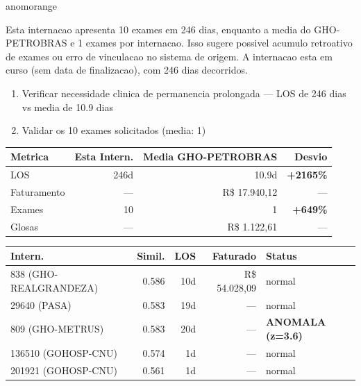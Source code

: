 \documentclass[a4paper,10pt]{article}
\begin{document}
\begin{anomalycard}[Internacao 140406 | GHO-PETROBRAS | ALTO (z=4.79)]{anomorange}
\vspace{2pt}\begin{tcolorbox}[colback=severityred!20,colframe=anomorange,title={\textbf{Interpretacao de Negocio}},fonttitle=\bfseries\small,left=4pt,right=4pt,top=3pt,bottom=3pt]
{\small Esta internacao apresenta 10 exames em 246 dias, enquanto a media do GHO-PETROBRAS e 1 exames por internacao. Isso sugere possivel acumulo retroativo de exames ou erro de vinculacao no sistema de origem. A internacao esta em curso (sem data de finalizacao), com 246 dias decorridos.}
\end{tcolorbox}
\begin{tcolorbox}[colback=severityyellow!30,colframe=anomorange,title={\textbf{Recomendacoes Especificas}},fonttitle=\bfseries\small,left=4pt,right=4pt,top=3pt,bottom=3pt]
\begin{enumerate}[nosep,leftmargin=16pt]
\item {\small Verificar necessidade clinica de permanencia prolongada --- LOS de 246 dias vs media de 10.9 dias}
\item {\small Validar os 10 exames solicitados (media: 1)}
\end{enumerate}
\end{tcolorbox}
\begin{center}\begin{tabular}{l r r r}\toprule\textbf{Metrica} & \textbf{Esta Intern.} & \textbf{Media GHO-PETROBRAS} & \textbf{Desvio} \\\midrule
LOS & 246d & 10.9d & \textcolor{anomred}{\textbf{+2165\%}} \\
Faturamento & --- & R\$ 17.940,12 & --- \\
Exames & 10 & 1 & \textcolor{anomred}{\textbf{+649\%}} \\
Glosas & --- & R\$ 1.122,61 & --- \\
\bottomrule\end{tabular}\end{center}

\begin{tabular}{l r r r l}\toprule\textbf{Intern.} & \textbf{Simil.} & \textbf{LOS} & \textbf{Faturado} & \textbf{Status} \\\midrule
838 (GHO-REALGRANDEZA) & 0.586 & 10d & R\$ 54.028,09 & \textcolor{jcubeblue}{normal} \\
29640 (PASA) & 0.583 & 19d & --- & \textcolor{jcubeblue}{normal} \\
809 (GHO-METRUS) & 0.583 & 20d & --- & \textcolor{anomred}{\textbf{ANOMALA (z=3.6)}} \\
136510 (GOHOSP-CNU) & 0.574 & 1d & --- & \textcolor{jcubeblue}{normal} \\
201921 (GOHOSP-CNU) & 0.561 & 1d & --- & \textcolor{jcubeblue}{normal} \\
\bottomrule\end{tabular}


\end{anomalycard}
\end{document}
